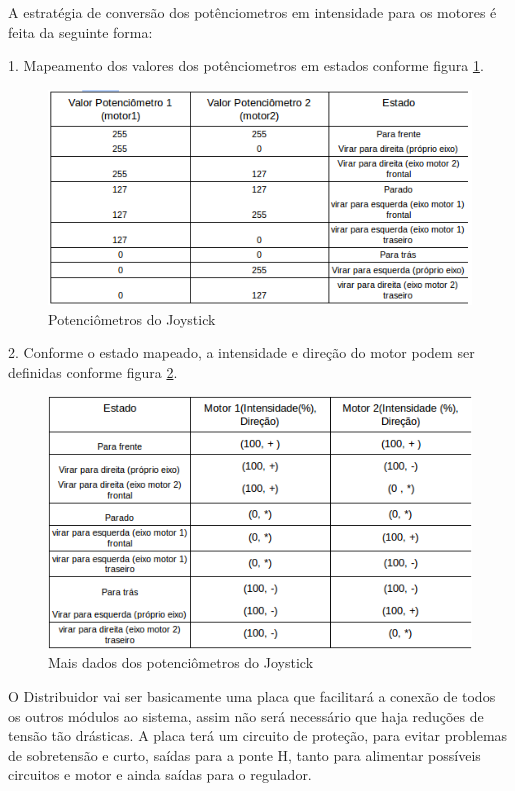 A estratégia de conversão dos potênciometros em intensidade para os motores é feita da seguinte forma:

1. Mapeamento dos valores dos potênciometros em estados conforme figura \ref{fig:tabela-pots}.

\begin{figure}[!htb]
\centering
  \includegraphics[keepaspectratio=true,scale=0.6]{figuras/resultados/tabela-pots}
\caption{Potenciômetros do Joystick}
\label{fig:tabela-pots}
\end{figure}

2. Conforme o estado mapeado, a intensidade e direção do motor podem ser definidas conforme figura \ref{fig:tabela-pots2}.

\begin{figure}[!htb]
\centering
  \includegraphics[keepaspectratio=true,scale=0.6]{figuras/resultados/tabela-pots2}
\caption{Mais dados dos potenciômetros do Joystick}
\label{fig:tabela-pots2}
\end{figure}

O Distribuidor vai ser basicamente uma placa que facilitará a conexão de todos os outros módulos ao sistema, assim não será necessário que haja reduções de tensão tão drásticas. A placa terá um circuito de proteção, para evitar problemas de sobretensão e curto, saídas para a ponte H, tanto para alimentar possíveis circuitos e motor e ainda saídas para o regulador.

